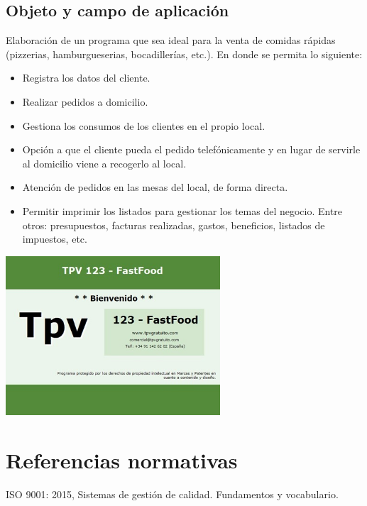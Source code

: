 \documentclass[12pt,a4paper]{article}
\begin{document}
\subsection{Objeto y campo de aplicación}
Elaboración de un programa que sea ideal para la venta de comidas rápidas (pizzerias, hamburgueserias, bocadillerías, etc.). En donde se permita lo siguiente:
\begin{itemize}
\item Registra los datos del cliente.
\item Realizar pedidos a domicilio.
\item Gestiona los consumos de los clientes en el propio local.
\item Opción a que el cliente pueda el pedido telefónicamente y en lugar de servirle al domicilio viene a recogerlo al local.
\item Atención de pedidos en las mesas del local, de forma directa.
\item Permitir imprimir los listados para gestionar los temas del negocio. Entre otros: presupuestos, facturas realizadas, gastos, beneficios, listados de impuestos, etc.
\end{itemize}
\begin{center}
\includegraphics[width=0.6\textwidth]{primeraimagen.jpg}  
\end{center}

\section{Referencias normativas}\textbf{}
ISO 9001: 2015, Sistemas de gestión de calidad. Fundamentos y vocabulario.
\end{document}
